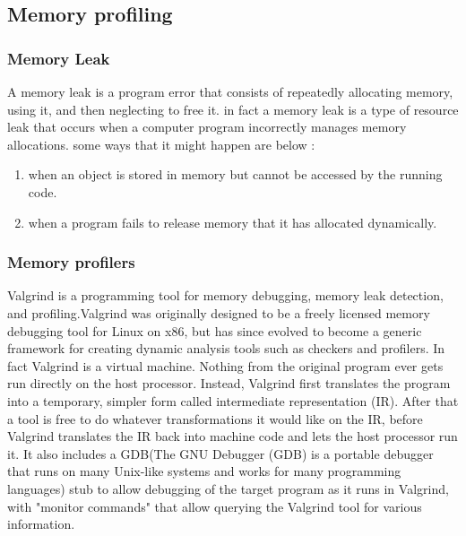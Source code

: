 \documentclass[titlepage]{article}
\begin{document}
\subsection {Memory profiling}
\subsubsection {Memory Leak}
A memory leak is a program error that consists of repeatedly allocating memory, using it, and then neglecting to free it.
\newline in fact  a memory leak is a type of resource leak that occurs when a computer program incorrectly manages memory allocations. some ways that it might happen are below :
\begin{enumerate}
\item{when an object is stored in memory but cannot be accessed by the running code. }
\item{when a program fails to release memory that it has allocated dynamically.}
\end{enumerate}
\subsubsection {Memory profilers}
Valgrind is a programming tool for memory debugging, memory leak detection, and profiling.\newline Valgrind was originally designed to be a freely licensed memory debugging tool for Linux on x86, but has since evolved to become a generic framework for creating dynamic analysis tools such as checkers and profilers.\newline
In fact Valgrind is a virtual machine. Nothing from the original program ever gets run directly on the host processor. Instead, Valgrind first translates the program into a temporary, simpler form called intermediate representation (IR). After that a tool is free to do whatever transformations it would like on the IR, before Valgrind translates the IR back into machine code and lets the host processor run it. It also includes a GDB(The GNU Debugger (GDB) is a portable debugger that runs on many Unix-like systems and works for many programming languages) stub to allow debugging of the target program as it runs in Valgrind, with "monitor commands" that allow querying the Valgrind tool for various information.
\end{document}
